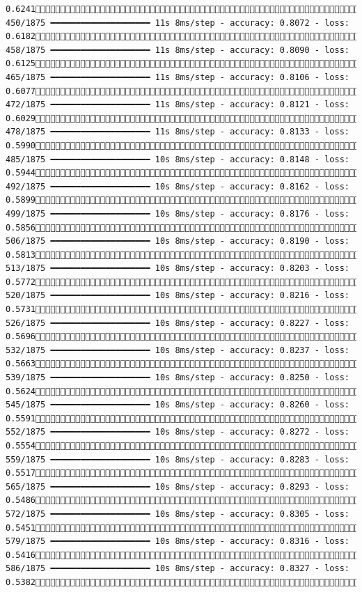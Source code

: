 \documentclass[
  letterpaper,
  DIV=11,
  numbers=noendperiod]{scrreprt}
\begin{document}
\begin{verbatim}
0.6241 450/1875 ━━━━━━━━━━━━━━━━━━━━ 11s 8ms/step - accuracy: 0.8072 - loss: 0.6182 458/1875 ━━━━━━━━━━━━━━━━━━━━ 11s 8ms/step - accuracy: 0.8090 - loss: 0.6125 465/1875 ━━━━━━━━━━━━━━━━━━━━ 11s 8ms/step - accuracy: 0.8106 - loss: 0.6077 472/1875 ━━━━━━━━━━━━━━━━━━━━ 11s 8ms/step - accuracy: 0.8121 - loss: 0.6029 478/1875 ━━━━━━━━━━━━━━━━━━━━ 11s 8ms/step - accuracy: 0.8133 - loss: 0.5990 485/1875 ━━━━━━━━━━━━━━━━━━━━ 10s 8ms/step - accuracy: 0.8148 - loss: 0.5944 492/1875 ━━━━━━━━━━━━━━━━━━━━ 10s 8ms/step - accuracy: 0.8162 - loss: 0.5899 499/1875 ━━━━━━━━━━━━━━━━━━━━ 10s 8ms/step - accuracy: 0.8176 - loss: 0.5856 506/1875 ━━━━━━━━━━━━━━━━━━━━ 10s 8ms/step - accuracy: 0.8190 - loss: 0.5813 513/1875 ━━━━━━━━━━━━━━━━━━━━ 10s 8ms/step - accuracy: 0.8203 - loss: 0.5772 520/1875 ━━━━━━━━━━━━━━━━━━━━ 10s 8ms/step - accuracy: 0.8216 - loss: 0.5731 526/1875 ━━━━━━━━━━━━━━━━━━━━ 10s 8ms/step - accuracy: 0.8227 - loss: 0.5696 532/1875 ━━━━━━━━━━━━━━━━━━━━ 10s 8ms/step - accuracy: 0.8237 - loss: 0.5663 539/1875 ━━━━━━━━━━━━━━━━━━━━ 10s 8ms/step - accuracy: 0.8250 - loss: 0.5624 545/1875 ━━━━━━━━━━━━━━━━━━━━ 10s 8ms/step - accuracy: 0.8260 - loss: 0.5591 552/1875 ━━━━━━━━━━━━━━━━━━━━ 10s 8ms/step - accuracy: 0.8272 - loss: 0.5554 559/1875 ━━━━━━━━━━━━━━━━━━━━ 10s 8ms/step - accuracy: 0.8283 - loss: 0.5517 565/1875 ━━━━━━━━━━━━━━━━━━━━ 10s 8ms/step - accuracy: 0.8293 - loss: 0.5486 572/1875 ━━━━━━━━━━━━━━━━━━━━ 10s 8ms/step - accuracy: 0.8305 - loss: 0.5451 579/1875 ━━━━━━━━━━━━━━━━━━━━ 10s 8ms/step - accuracy: 0.8316 - loss: 0.5416 586/1875 ━━━━━━━━━━━━━━━━━━━━ 10s 8ms/step - accuracy: 0.8327 - loss: 0.5382 
\end{verbatim}
\end{document}
